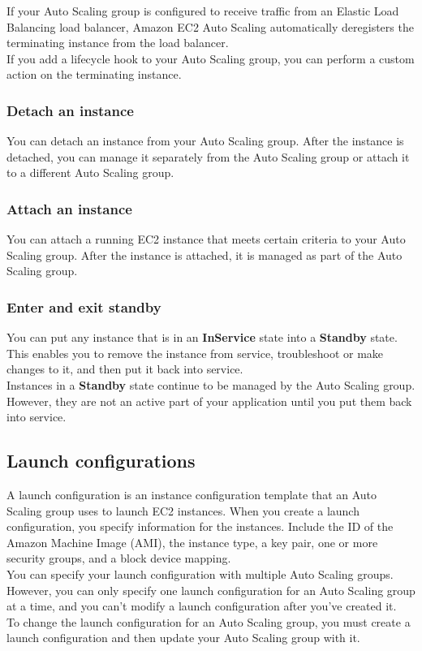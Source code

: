 \documentclass[12pt, letterpaper, twoside]{article}
\begin{document}
If your Auto Scaling group is configured to receive traffic from an Elastic Load Balancing load balancer, Amazon 
EC2 Auto Scaling automatically deregisters the terminating instance from the load balancer.\\
If you add a lifecycle hook to your Auto Scaling group, you can perform a custom action on the terminating instance.

\subsubsection{Detach an instance}
You can detach an instance from your Auto Scaling group. After the instance is detached, you can manage it separately 
from the Auto Scaling group or attach it to a different Auto Scaling group.

\subsubsection{Attach an instance}
You can attach a running EC2 instance that meets certain criteria to your Auto Scaling group. After the instance is 
attached, it is managed as part of the Auto Scaling group.

\subsubsection{Enter and exit standby}
You can put any instance that is in an \textbf{InService} state into a \textbf{Standby} state. This enables you to 
remove the instance from service, troubleshoot or make changes to it, and then put it back into service.\\
Instances in a \textbf{Standby} state continue to be managed by the Auto Scaling group. However, they are not an 
active part of your application until you put them back into service.\\

\subsection{Launch configurations}
A launch configuration is an instance configuration template that an Auto Scaling group uses to launch EC2 instances. 
When you create a launch configuration, you specify information for the instances. Include the ID of the Amazon 
Machine Image (AMI), the instance type, a key pair, one or more security groups, and a block device mapping.\\

You can specify your launch configuration with multiple Auto Scaling groups. However, you can only specify one 
launch configuration for an Auto Scaling group at a time, and you can't modify a launch configuration after you've 
created it.\\
To change the launch configuration for an Auto Scaling group, you must create a launch configuration and then update 
your Auto Scaling group with it.\\
\end{document}

